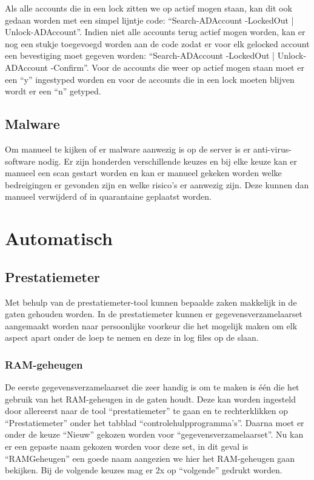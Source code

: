 \documentclass[pdftex,a4paper,12pt]{report}
\begin{document}
Als alle accounts die in een lock zitten we op actief mogen staan, kan dit ook gedaan worden met een simpel lijntje code: "`Search-ADAccount -LockedOut | Unlock-ADAccount"'. Indien niet alle accounts terug actief mogen worden, kan er nog een stukje toegevoegd worden aan de code zodat er voor elk gelocked account een bevestiging moet gegeven worden: "`Search-ADAccount -LockedOut | Unlock-ADAccount -Confirm"'. Voor de accounts die weer op actief mogen staan moet er een "`y"' ingestyped worden en voor de accounts die in een lock moeten blijven wordt er een "`n"' getyped.

\subsection{Malware}
Om manueel te kijken of er malware aanwezig is op de server is er anti-virus-software nodig. Er zijn honderden verschillende keuzes en bij elke keuze kan er manueel een scan gestart worden en kan er manueel gekeken worden welke bedreigingen er gevonden zijn en welke risico's er aanwezig zijn. Deze kunnen dan manueel verwijderd of in quarantaine geplaatst worden. 

\section{Automatisch}
\subsection{Prestatiemeter}
Met behulp van de prestatiemeter-tool kunnen bepaalde zaken makkelijk in de gaten gehouden worden. In de prestatiemeter kunnen er gegevensverzamelaarset aangemaakt worden naar persoonlijke voorkeur die het mogelijk maken om elk aspect apart onder de loep te nemen en deze in log files op de slaan.

\subsubsection{RAM-geheugen}
De eerste gegevensverzamelaarset die zeer handig is om te maken is één die het gebruik van het RAM-geheugen in de gaten houdt. Deze kan worden ingesteld door allereerst naar de tool "`prestatiemeter"' te gaan en te rechterklikken op "`Prestatiemeter"' onder het tabblad "`controlehulpprogramma's"'. Daarna moet er onder de keuze "`Nieuw"' gekozen worden voor "`gegevensverzamelaarset"'. Nu kan er een gepaste naam gekozen worden voor deze set, in dit geval is "`RAMGeheugen"' een goede naam aangezien we hier het RAM-geheugen gaan bekijken. Bij de volgende keuzes mag er 2x op "`volgende"' gedrukt worden. \newline
\end{document}
